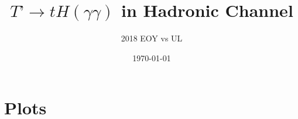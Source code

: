 \documentclass[usenames,dvipsnames]{beamer} %
\title{$T’ \to tH(\gamma\gamma)$ in Hadronic Channel}
\author{2018 EOY vs UL}
\date{\today}
\begin{document}
\frame{\titlepage}

%

\section{Plots}

\end{document}
